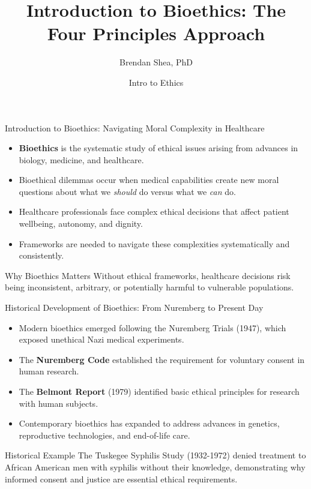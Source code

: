 \documentclass{beamer}
\title{Introduction to Bioethics: The Four Principles Approach}
\author{Brendan Shea, PhD}
\date{Intro to Ethics}
\begin{document}
	
	\begin{frame}
		\titlepage
	\end{frame}
	
	\begin{frame}{Introduction to Bioethics: Navigating Moral Complexity in Healthcare}
		\begin{itemize}
			\item \textbf{Bioethics} is the systematic study of ethical issues arising from advances in biology, medicine, and healthcare.
			\item Bioethical dilemmas occur when medical capabilities create new moral questions about what we \textit{should} do versus what we \textit{can} do.
			\item Healthcare professionals face complex ethical decisions that affect patient wellbeing, autonomy, and dignity.
			\item Frameworks are needed to navigate these complexities systematically and consistently.
		\end{itemize}
		
		\begin{alertblock}{Why Bioethics Matters}
			Without ethical frameworks, healthcare decisions risk being inconsistent, arbitrary, or potentially harmful to vulnerable populations.
		\end{alertblock}
	\end{frame}
	
	\begin{frame}{Historical Development of Bioethics: From Nuremberg to Present Day}
		\begin{itemize}
			\item Modern bioethics emerged following the Nuremberg Trials (1947), which exposed unethical Nazi medical experiments.
			\item The \textbf{Nuremberg Code} established the requirement for voluntary consent in human research.
			\item The \textbf{Belmont Report} (1979) identified basic ethical principles for research with human subjects.
			\item Contemporary bioethics has expanded to address advances in genetics, reproductive technologies, and end-of-life care.
		\end{itemize}
		
		\begin{exampleblock}{Historical Example}
			The Tuskegee Syphilis Study (1932-1972) denied treatment to African American men with syphilis without their knowledge, demonstrating why informed consent and justice are essential ethical requirements.
		\end{exampleblock}
	\end{frame}
	
\end{document}
